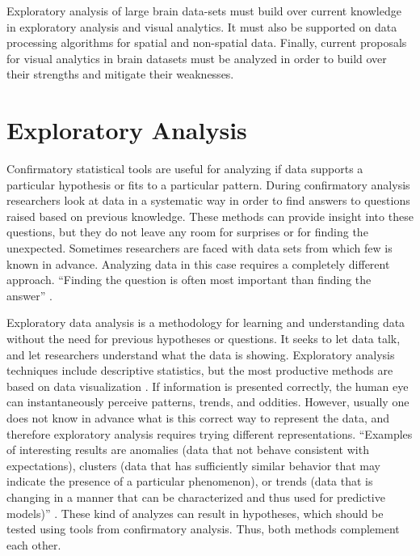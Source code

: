  
Exploratory analysis of large brain data-sets must build over current knowledge in exploratory analysis and visual analytics. It must also be supported on data processing algorithms for spatial and non-spatial data. Finally, current proposals for visual analytics in brain datasets must be analyzed in order to build over their strengths and mitigate their weaknesses.



\section{Exploratory Analysis}

%


Confirmatory statistical tools are useful for analyzing if data supports a particular hypothesis or fits to a particular pattern.  During confirmatory analysis researchers look at data in a systematic way in order to find answers to questions raised based on previous knowledge. These methods can provide insight into these questions, but they do not leave any room for surprises or for finding the unexpected. Sometimes researchers are faced with data sets from which few is known in advance. Analyzing data in this case requires a completely different approach. ``Finding the question is often most important than finding the answer'' \autocite{tukey_we_1980}.

Exploratory data analysis is a methodology for learning and understanding data without the need for previous hypotheses or questions. It seeks to let data talk, and let researchers understand what the data is showing. Exploratory analysis techniques include descriptive statistics, but the most productive methods are based on data visualization \autocite{tukey_exploratory_1977}. If information is presented correctly, the human eye can instantaneously perceive patterns, trends, and oddities. However, usually one does not know in advance what is this correct way to represent the data, and therefore exploratory analysis requires trying different representations. 
``Examples of interesting results are anomalies (data that not behave consistent with expectations), clusters (data that has sufficiently similar behavior that may indicate the presence of a particular phenomenon), or trends (data that is changing in a manner that can be characterized and thus used for predictive models)'' \autocite{ward_interactive_2010}.
These kind of analyzes can result in hypotheses, which should be tested using tools from confirmatory analysis. Thus, both methods complement each other.

